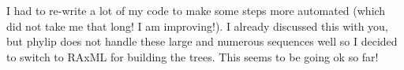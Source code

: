 \documentclass[12pt]{article}
\newcommand{\smel}{\textit{S.\,meliloti}\xspace}
\newcommand{\ecoli}{\textit{Escherichia coli}\xspace}
\begin{document}
I had to re-write a lot of my code to make some steps more automated (which did not take me that long! I am improving!).
I already discussed this with you, but phylip does not handle these large and numerous sequences well so I decided to switch to RAxML for building the trees.
This seems to be going ok so far!






%
%
%
\end{document}
